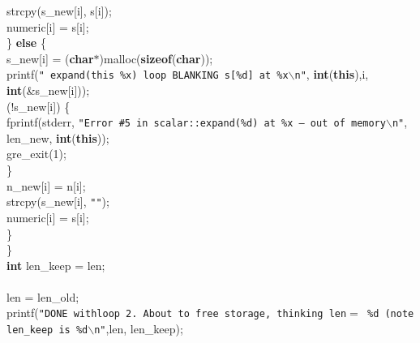 \begin{flushleft}
\hspace*{12\indentation}strcpy(s\_new[i], s[i]);\mbox{}\\
\hspace*{12\indentation}numeric[i] = s[i];\mbox{}\\
\hspace*{8\indentation}\} {\bf else} \{\mbox{}\\
\hspace*{12\indentation}s\_new[i] = ({\bf char}$\ast$)malloc({\bf sizeof}({\bf char}));\mbox{}\\
\hspace*{12\indentation}printf({\tt"    expand(this \%x) loop BLANKING s[\%d] at \%x$\backslash$n"}, {\bf int}({\bf this}),i, {\bf int}(\&s\_new[i]));\mbox{}\\
\hspace*{12\indentation}{\bf if} (!s\_new[i]) \{\mbox{}\\
\hspace*{16\indentation}fprintf(stderr, {\tt"Error \#5 in scalar::expand(\%d) at \%x -- out of memory$\backslash$n"}, len\_new, {\bf int}({\bf this}));\mbox{}\\
\hspace*{16\indentation}gre\_exit(1);\mbox{}\\
\hspace*{12\indentation}\}\mbox{}\\
\hspace*{12\indentation}n\_new[i] = n[i];\mbox{}\\
\hspace*{12\indentation}strcpy(s\_new[i], {\tt""});\mbox{}\\
\hspace*{12\indentation}numeric[i] = s[i];\mbox{}\\
\hspace*{8\indentation}\}\mbox{}\\
\hspace*{4\indentation}\}\mbox{}\\
\hspace*{4\indentation}{\bf unsigned} {\bf int} len\_keep = len;\mbox{}\\
\mbox{}\\
\hspace*{4\indentation}len = len\_old;\mbox{}\\
\hspace*{4\indentation}printf({\tt"DONE withloop   2.  About to free storage, thinking len$=$ \%d (note len\_keep is \%d$\backslash$n"},len, len\_keep);\mbox{}\\

\end{flushleft}
